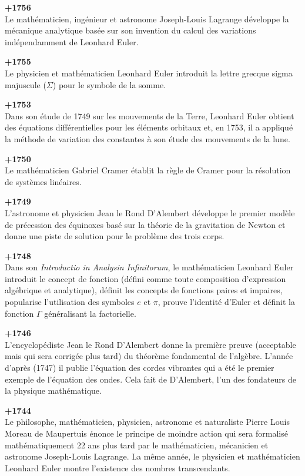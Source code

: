 \textbf{+1756}\\
Le mathématicien, ingénieur et astronome Joseph-Louis Lagrange développe la mécanique analytique basée sur son invention du calcul des variations indépendamment de Leonhard Euler.

\textbf{+1755}\\
Le physicien et mathématicien Leonhard Euler introduit la lettre grecque sigma majuscule ($\Sigma$) pour le symbole de la somme.

\textbf{+1753}\\
Dans son étude de 1749 sur les mouvements de la Terre, Leonhard Euler obtient des équations différentielles pour les éléments orbitaux et, en 1753, il a appliqué la méthode de variation des constantes à son étude des mouvements de la lune.

\textbf{+1750}\\
Le mathématicien Gabriel Cramer établit la règle de Cramer pour la résolution de systèmes linéaires.

\textbf{+1749}\\
L'astronome et physicien Jean le Rond D'Alembert développe le premier modèle de précession des équinoxes basé sur la théorie de la gravitation de Newton et donne une piste de solution pour le problème des trois corps.

\textbf{+1748}\\
Dans son \textit{Introductio in Analysin Infinitorum}, le mathématicien Leonhard Euler introduit le concept de fonction (défini comme toute composition d'expression algébrique et analytique), définit les concepts de fonctions paires et impaires, popularise l'utilisation des symboles $e$ et $\pi$, prouve l'identité d'Euler et définit la fonction $\Gamma$ généralisant la factorielle.

\textbf{+1746}\\
L'encyclopédiste Jean le Rond D'Alembert donne la première preuve (acceptable mais qui sera corrigée plus tard) du théorème fondamental de l'algèbre. L'année d'après (1747) il publie l'équation des cordes vibrantes qui a été le premier exemple de l'équation des ondes. Cela fait de D'Alembert, l'un des fondateurs de la physique mathématique.

\textbf{+1744}\\
Le philosophe, mathématicien, physicien, astronome et naturaliste Pierre Louis Moreau de Maupertuis énonce le principe de moindre action qui sera formalisé mathématiquement 22 ans plus tard par le mathématicien, mécanicien et astronome Joseph-Louis Lagrange. La même année, le physicien et mathématicien Leonhard Euler montre l'existence des nombres transcendants.

